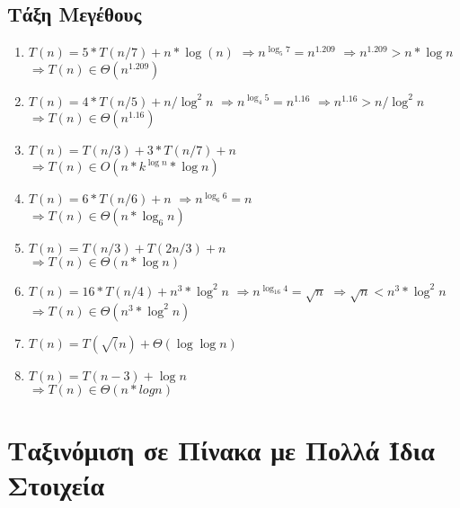 \documentclass[a4paper,10pt]{article} \usepackage{anysize}
\begin{document}
\subsection{Τάξη Μεγέθους}
\begin{enumerate}
\item $T(n)=5*T(n/7)+n*\log(n)$
$\Rightarrow n^{\log _5 {7}} = n^{1.209}$
$\Rightarrow n^{1.209} > n*\log{n}$\\
$\Rightarrow T(n) \in \Theta(n^{1.209})$

\item $T(n) = 4*T(n/5)+n/\log^2{n}$
$\Rightarrow n^{\log_4 {5}} = n^{1.16}$
$\Rightarrow n^{1.16} > n/\log^2{n}$\\
$\Rightarrow T(n) \in \Theta(n^{1.16})$

\item $T(n) = T(n/3) +3*T(n/7)+n$\\
$\Rightarrow T(n) \in O(n*k^{\log{n}}*\log{n})$

\item $T(n) = 6*T(n/6)+n$
$\Rightarrow n^{\log _6 {6}} = n$\\
$\Rightarrow T(n) \in \Theta(n*\log _6 {n})$

\item $T(n) = T(n/3) + T(2n/3) + n$\\
$\Rightarrow T(n) \in \Theta(n*\log{n})$

\item $T(n) = 16*T(n/4) + n^3*\log^2{n}$
$\Rightarrow n^{\log _16{4}} = \sqrt{n}$
$\Rightarrow \sqrt{n} < n^3*\log^2{n}$\\
$\Rightarrow T(n) \in \Theta(n^3*\log^2{n})$

\item $T(n) = T(\sqrt(n) + \Theta(\log{\log{n}})$

\item $T(n) = T(n-3) + \log{n}$\\
$\Rightarrow T(n) \in \Theta(n*logn)$

\end{enumerate}

\section{Ταξινόμιση σε Πίνακα με Πολλά Ίδια Στοιχεία}
\end{document}
